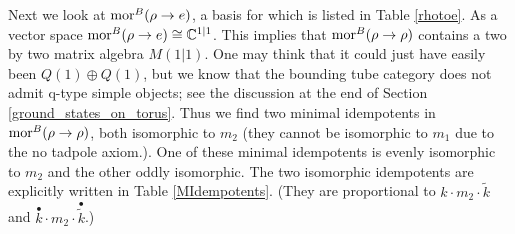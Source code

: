 Next we look at $\text{mor}^B(\rho \to e)$, 
a basis for which is listed in Table \ref{rhotoe}. 
As a vector space $\text{mor}^B(\rho \to e ) \cong \mathbb{C}^{1|1}$. 
This implies that $\text{mor}^B(\rho \to \rho)$ contains a two by two matrix algebra $M(1|1)$.
One may think that it could just have easily been $Q(1)\oplus Q(1)$, 
but we know that the bounding tube category does not admit q-type simple objects; see the discussion at the end of Section \ref{ground_states_on_torus}.
Thus we find two minimal idempotents in $\text{mor}^B(\rho \to \rho)$, both isomorphic to $m_2$ (they cannot be isomorphic to $m_1$ due to the no tadpole axiom.).
One of these minimal idempotents is evenly isomorphic to $m_2$ and the other oddly isomorphic. 
The two isomorphic idempotents are explicitly written in Table \ref{MIdempotents}.
(They are proportional to $k \cdot m_2\cdot  \tilde{k}$ and $\overset{\bullet}{k} \cdot m_2 \cdot \overset{\bullet}{\tilde{k}}$.)



